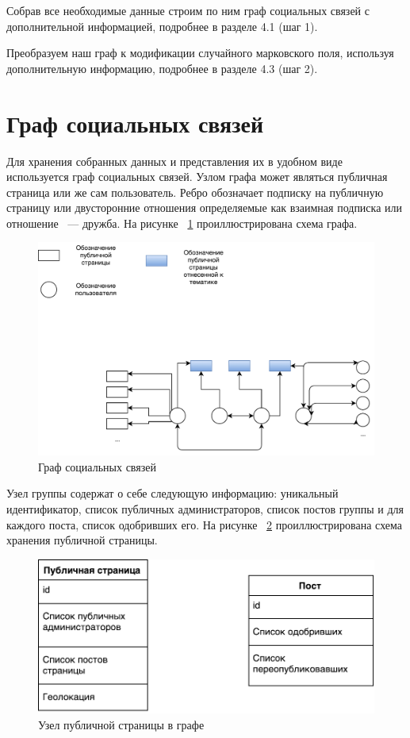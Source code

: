 \documentclass[annotation,times,page4]{itmo-student-thesis}
\begin{document}
Собрав все необходимые данные строим по ним граф социальных связей с дополнительной информацией, подробнее в разделе 4.1 (шаг 1).

Преобразуем наш граф к модификации случайного марковского поля, используя дополнительную информацию, подробнее в разделе 4.3 (шаг 2).

\section{Граф социальных связей}
Для хранения собранных данных и представления их в удобном виде используется граф социальных связей.
Узлом графа может являться публичная страница или же сам пользователь. Ребро обозначает подписку на публичную страницу или двусторонние отношения определяемые как взаимная подписка или отношение ~--- дружба. На рисунке ~\ref{fig:grapth} проиллюстрирована схема графа.

\begin{figure}[!h]
\caption{Граф социальных связей}
\label{fig:grapth}
\centering
\includegraphics[width=\textwidth]{figs/graph.pdf}
\end{figure}

Узел группы содержат о себе следующую информацию: уникальный идентификатор, список публичных администраторов, список постов группы и для каждого поста, список одобривших его. На рисунке ~\ref{fig:public} проиллюстрирована схема хранения публичной страницы.

\begin{figure}[!h]
\caption{Узел публичной страницы в графе}
\label{fig:public}
\centering
\includegraphics[width=\textwidth]{figs/public.pdf}
\end{figure}
\end{document}
